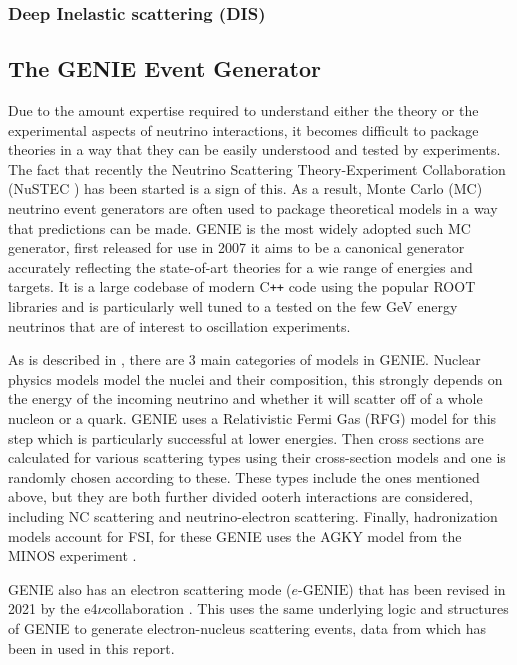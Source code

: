 \documentclass[a4paper,12pt]{article}
\newcommand{\efn}{e4$\nu$}
\newcommand{\eGEN}{$e\text{-GENIE}$}
\begin{document}
\subsubsection{Deep Inelastic scattering (DIS)}

\subsection{The GENIE Event Generator \cite{andreopoulosGENIENeutrinoMonte2010}}
Due to the amount expertise required to understand either the theory or the experimental aspects of neutrino interactions, it becomes difficult to package theories in a way that they can be easily understood and tested by experiments.
The fact that recently the Neutrino Scattering Theory-Experiment Collaboration (NuSTEC \cite{alvarez-rusoNuSTEC11NeutrinoScattering2018}) has been started is a sign of this.
As a result, Monte Carlo (MC) neutrino event generators are often used to package theoretical models in a way that predictions can be made.
GENIE is the most widely adopted such MC generator, first released for use in 2007 it aims to be a canonical generator accurately reflecting the state-of-art theories for a wie range of energies and targets.
It is a large codebase of modern C\texttt{++} code using the popular ROOT libraries\cite{brunROOTObjectOriented1997} and is particularly well tuned to a tested on the few \si{GeV} energy neutrinos that are of interest to oscillation experiments.

As is described in \cite{andreopoulosGENIENeutrinoMonte2010}, there are 3 main categories of models in GENIE.
Nuclear physics models model the nuclei and their composition, this strongly depends on the energy of the incoming neutrino and whether it will scatter off of a whole nucleon or a quark.
GENIE uses a Relativistic Fermi Gas (RFG) model for this step which is particularly successful at lower energies.
Then cross sections are calculated for various scattering types using their cross-section models and one is randomly chosen according to these.
These types include the ones mentioned above, but they are both further divided ooterh interactions are considered, including NC scattering and neutrino-electron scattering.
Finally, hadronization models account for FSI, for these GENIE uses the AGKY model from the MINOS experiment \cite{HadronizationModelMINOS}.

GENIE also has an electron scattering mode (\eGEN) that has been revised in 2021 by the \efn collaboration \cite{e4ncollaborationInclusiveElectronScattering2021}.
This uses the same underlying logic and structures of GENIE to generate electron-nucleus scattering events, data from which has been in used in this report.
\end{document}

